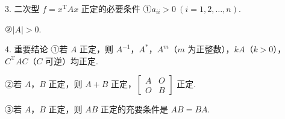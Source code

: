\begin{fcard}{3. 二次型 $f=x^{\mathrm{T}}Ax$ 正定的必要条件}
①$a_{ii}>0\ (i=1,2,\dots,n)$.

②$|A|>0$.
\end{fcard}


\begin{fcard}{4. 重要结论}
①若 $A$ 正定，则 $A^{-1}$，$A^{*}$，$A^{m}$（$m$ 为正整数），$kA$（$k>0$），$C^{\mathrm{T}}AC$（$C$ 可逆）均正定.

②若 $A$，$B$ 正定，则 $A+B$ 正定，$\begin{bmatrix}A&O\\O&B\end{bmatrix}$ 正定.

③若 $A$，$B$ 正定，则 $AB$ 正定的充要条件是 $AB=BA$.
\end{fcard}

